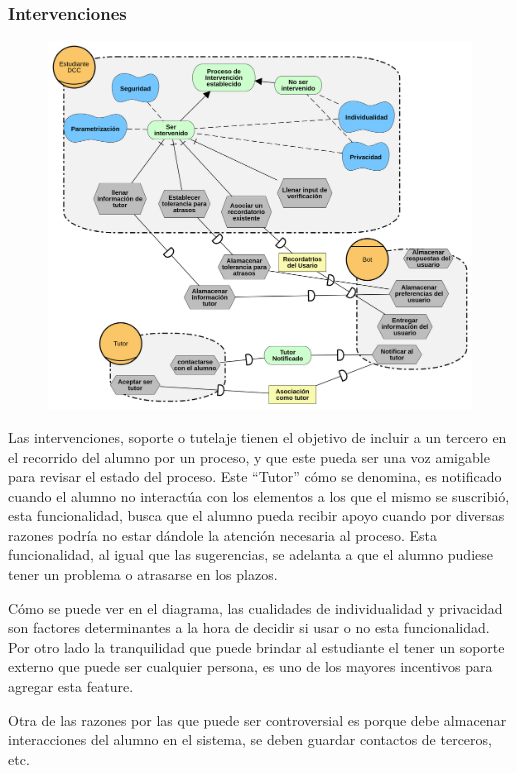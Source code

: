     \subsubsection{Intervenciones}
        \begin{figure}[ht]
            \centering
            \includegraphics[width=\textwidth]{media/imagenes/i_star/diagramas/Intervenciones.png}
            \caption{}
            \label{}
        \end{figure}
        \par Las intervenciones, soporte o tutelaje tienen el objetivo de incluir a un tercero en el recorrido del alumno por un proceso, y que este pueda ser una voz amigable para revisar el estado del proceso. Este “Tutor” cómo se denomina, es notificado cuando el alumno no interactúa con los elementos a los que el mismo se suscribió, esta funcionalidad, busca que el alumno pueda recibir apoyo cuando por diversas razones podría no estar dándole la atención necesaria al proceso. Esta funcionalidad, al igual que las sugerencias, se adelanta a que el alumno pudiese tener un problema o atrasarse en los plazos.
        \par Cómo se puede ver en el diagrama, las cualidades de individualidad y privacidad son factores determinantes a la hora de decidir si usar o no esta funcionalidad. Por otro lado la tranquilidad que puede brindar al estudiante el tener un soporte externo que puede ser cualquier persona, es uno de los mayores incentivos para agregar esta feature.
        \par Otra de las razones por las que puede ser controversial es porque debe almacenar interacciones del alumno en el sistema, se deben guardar contactos de terceros, etc.

